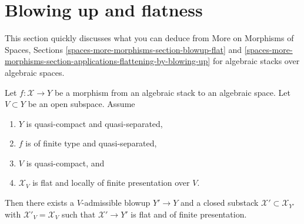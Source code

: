 \section{Blowing up and flatness}
\label{section-blowup-flat}

\noindent
This section quickly discusses what you can deduce from
More on Morphisms of Spaces, Sections
\ref{spaces-more-morphisms-section-blowup-flat} and
\ref{spaces-more-morphisms-section-applications-flattening-by-blowing-up}
for algebraic stacks over algebraic spaces.

\begin{lemma}
\label{lemma-flatten-stack}
Let $f : \mathcal{X} \to Y$ be a morphism from an algebraic stack
to an algebraic space. Let $V \subset Y$ be an open subspace. Assume
\begin{enumerate}
\item $Y$ is quasi-compact and quasi-separated,
\item $f$ is of finite type and quasi-separated,
\item $V$ is quasi-compact, and
\item $\mathcal{X}_V$ is flat and locally of finite presentation over $V$.
\end{enumerate}
Then there exists a $V$-admissible blowup $Y' \to Y$
and a closed substack $\mathcal{X}' \subset \mathcal{X}_{Y'}$
with $\mathcal{X}'_V = \mathcal{X}_V$ such that
$\mathcal{X}' \to Y'$ is flat and of finite presentation.
\end{lemma}


